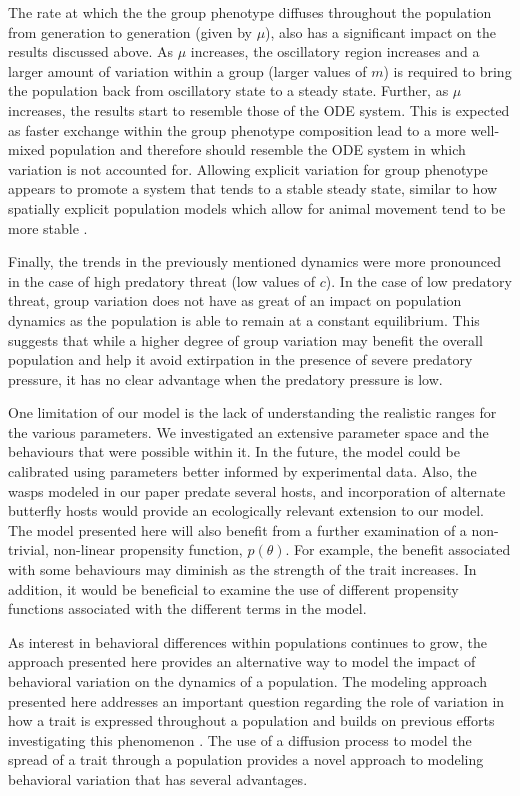\documentclass[review,authoryear]{elsarticle}
\newcommand{\origTheta}{{\theta}}
\newcommand{\origM}{m}
\begin{document}
The rate at which the the group phenotype diffuses throughout the population  from generation to generation (given by $\mu$), also has a significant impact on the results discussed above. As $\mu$ increases, the oscillatory region increases and a larger amount of variation within a group (larger values of $\origM$) is required to bring the population back from oscillatory state to a steady state.  Further, as $\mu$ increases, the results start to resemble those of the ODE system. This is expected as faster exchange within the group phenotype composition lead to a more well-mixed population and therefore should resemble the ODE system  in which variation is not accounted for. Allowing explicit variation for group phenotype appears to promote a system that tends to a stable steady state, similar to how spatially explicit population models which allow for animal movement tend to be more stable \citep{levins1969some}.

Finally, the trends in the previously mentioned dynamics were more pronounced in the case of high predatory threat (low values of $c$). In the case of low predatory threat, group variation does not have as great of an impact on population dynamics as the population is able to remain at a constant equilibrium.  This suggests that while a higher degree of group variation may benefit the overall population and help it avoid extirpation in the presence of severe predatory pressure, it has no clear advantage when the predatory pressure is low.

One limitation of our model is the lack of understanding the realistic ranges for the various parameters. We investigated an extensive parameter space and the behaviours that were possible within it. In the future, the model could be calibrated using parameters better informed by experimental data. Also, the wasps modeled in our paper predate several hosts, and incorporation of alternate butterfly hosts would provide an ecologically relevant extension to our model. The model presented here will also benefit from a further examination of a non-trivial, non-linear propensity function, $p(\origTheta)$. For example, the benefit associated with some behaviours may diminish as the strength of the trait increases. In addition, it would be beneficial to examine the use of different propensity functions associated with the different terms in the model.

 
As interest in behavioral differences within populations continues to grow, the approach presented here provides an alternative way to model the impact of behavioral variation on the dynamics of a population. The modeling approach presented here addresses an important question regarding the role of variation in how a trait is expressed throughout a population and builds on previous efforts investigating this phenomenon \citep{doi:10.1111/j.1461-0248.2010.01536.x,doi:10.1086/687235,mierzejewski_horn_luong_2019}. The use of a diffusion process to model the spread of a trait through a population provides a novel approach to modeling behavioral variation that has several advantages.
\end{document}
